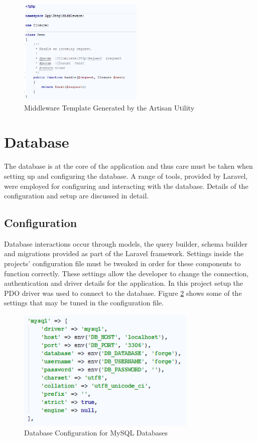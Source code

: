 \begin{figure}[H]
	\centering
	\includegraphics[height=2in]{Images/Implementation/MiddlewareTemplate}
	\caption{Middleware Template Generated by the Artisan Utility} \label{fig:MiddlewareTemplate}
\end{figure}

\section{Database}
The database is at the core of the application and thus care must be taken when setting up and configuring the database. A range of tools, provided by Laravel, were employed for configuring and interacting with the database. Details of the configuration and setup are discussed in detail.

\subsection{Configuration}
Database interactions occur through models, the query builder, schema builder and migrations provided as part of the Laravel framework. Settings inside the projects' configuration file must be tweaked in order for these components to function correctly. These settings allow the developer to change the connection, authentication and driver details for the application. In this project setup the PDO driver was used to connect to the database. Figure \ref{fig:DatabaseConfig} shows some of the settings that may be tuned in the configuration file.

\begin{figure}[H]
	\centering
	\includegraphics[height=2.3in]{Images/Implementation/MySQLConfig}
	\caption{Database Configuration for MySQL Databases} \label{fig:DatabaseConfig}
\end{figure}

